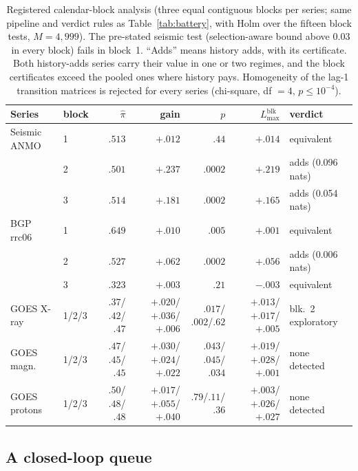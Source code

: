 \documentclass[11pt]{article}
\begin{document}
\begin{table}[h]\centering\footnotesize
\setlength{\tabcolsep}{3pt}
\begin{tabular}{llrrrrl}
\toprule
Series & block & $\hat\pi$ & gain & $p$ & $L^{\mathrm{blk}}_{\max}$ & verdict \\
\midrule
Seismic ANMO & 1 & $.513$ & $+.012$ & $.44$ & $+.014$ & equivalent \\
 & 2 & $.501$ & $+.237$ & $.0002$ & $\mathbf{+.219}$ & adds (0.096 nats) \\
 & 3 & $.514$ & $+.181$ & $.0002$ & $\mathbf{+.165}$ & adds (0.054 nats) \\
BGP rrc06 & 1 & $.649$ & $+.010$ & $.005$ & $+.001$ & equivalent \\
 & 2 & $.527$ & $+.062$ & $.0002$ & $+.056$ & adds (0.006 nats) \\
 & 3 & $.323$ & $+.003$ & $.21$ & $-.003$ & equivalent \\
GOES X-ray & 1/2/3 & $.37$/$.42$/$.47$ & $+.020$/$+.036$/$+.006$ & $.017$/$.002$/$.62$ & $+.013$/$+.017$/$+.005$ & blk.~2 exploratory \\
GOES magn. & 1/2/3 & $.47$/$.45$/$.45$ & $+.030$/$+.024$/$+.022$ & $.043$/$.045$/$.034$ & $+.019$/$+.028$/$+.001$ & none detected \\
GOES protons & 1/2/3 & $.50$/$.48$/$.48$ & $+.017$/$+.055$/$+.040$ & $.79$/$.11$/$.36$ & $+.003$/$+.026$/$+.027$ & none detected \\
\bottomrule
\end{tabular}
\caption{Registered calendar-block analysis (three equal contiguous blocks
per series; same pipeline and verdict rules as Table~\ref{tab:battery}, with
Holm over the fifteen block tests, $M=4{,}999$). The
pre-stated seismic test (selection-aware bound above $0.03$ in every block)
fails in block~1. ``Adds'' means history adds, with its certificate. Both history-adds series carry their value in one or two
regimes, and the block certificates exceed the pooled ones where history
pays. Homogeneity of the lag-1 transition matrices is rejected for every
series (chi-square, df $=4$, $p\le10^{-4}$).}
\label{tab:regimes}
\end{table}

\subsection{A closed-loop queue}\label{sec:queue}
\end{document}
